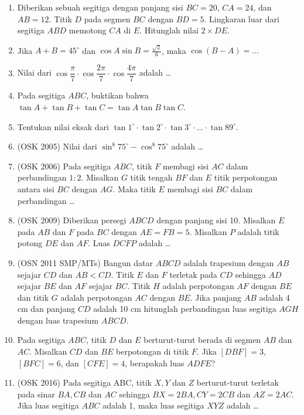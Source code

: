 \documentclass[11pt]{scrartcl}
\begin{document}
\begin{enumerate}
	\item
		Diberikan sebuah segitiga dengan panjang sisi $BC = 20$, $CA = 24$, dan $AB=12$. Titik $D$ pada segmen $BC$ dengan $BD = 5$. Lingkaran luar dari segitiga $ABD$ memotong $CA$ di $E$. Hitunglah nilai $2 \times DE$.
		
	\item Jika $A+B=45^\circ$ dan $\cos A\sin B=\frac{\sqrt{2}}{6}$, maka $\cos(B-A)=\dots$
	
	\item Nilai dari $\cos \dfrac{\pi}{7}\cdot \cos \dfrac{2\pi}{7} \cdot \cos \dfrac{4\pi}{7}$ adalah \dots
	
	\item Pada segitiga $ABC$, buktikan bahwa $\tan A + \tan B + \tan C = \tan A \tan B \tan C$.
	
	\item Tentukan nilai eksak dari $\tan 1^\circ \cdot \tan 2^\circ \cdot \tan 3^\circ \cdot \ldots \cdot \tan 89^\circ$.
	
	\item (OSK 2005) Nilai dari $\sin^8 75^\circ - \cos^8 75^\circ$ adalah \dots
	
	\item (OSK 2006) Pada segitiga $ABC$, titik $F$ membagi sisi $AC$ dalam perbandingan $1 : 2$. 
Misalkan $G$ titik tengah $BF$ dan $E$ titik perpotongan antara sisi $BC$ dengan $AG$. Maka titik $E$ membagi sisi $BC$
dalam perbandingan \dots

\item (OSK 2009) Diberikan persegi $ABCD$ dengan panjang sisi 10. Misalkan $E$ pada $AB$ dan $F$
pada $BC$ dengan $AE = FB = 5$. Misalkan $P$ adalah titik potong $DE$ dan $AF$. Luas $DCFP$ adalah \dots

\item (OSN 2011 SMP/MTs) Bangun datar $ABCD$ adalah
trapesium dengan $AB$ sejajar $CD$ dan $AB < CD$. Titik $E$ dan $F$ terletak
pada $CD$ sehingga $AD$ sejajar $BE$ dan $AF$ sejajar $BC$. Titik $H$ 
adalah perpotongan $AF$ dengan $BE$ dan titik $G$ adalah 
perpotongan $AC$ dengan $BE$. Jika panjang $AB$ adalah 4 cm
dan panjang $CD$ adalah 10 cm hitunglah perbandingan luas 
segitiga $AGH$ dengan luas trapesium $ABCD$. 

\item Pada segitiga $ABC$, titik $D$ dan $E$ berturut-turut berada di segmen $AB$ dan $AC$. Misalkan $CD$ dan $BE$ berpotongan di titik $F$. Jika $[DBF]=3$, $[BFC]=6$, dan $[CFE]=4$, berapakah luas $ADFE$?

\item (OSK 2016) Pada segitiga ABC, titik $X, Y$ dan $Z$ berturut-turut terletak pada sinar $BA, CB$ dan $AC$
	sehingga $BX = 2BA, CY = 2CB$ dan $AZ = 2AC$. Jika luas segitiga $ABC$ adalah 1, maka luas
	segitiga $XYZ$ adalah \dots
	

\end{enumerate}
\end{document}
